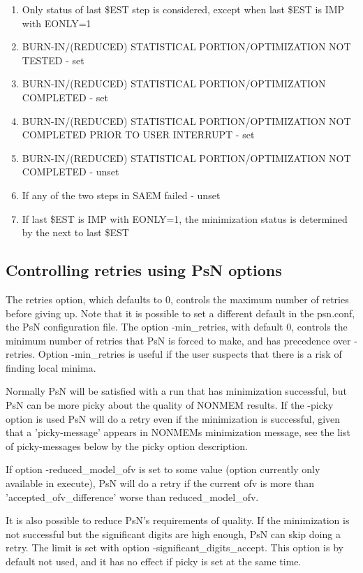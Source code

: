 \begin{enumerate}
\item Only status of last \$EST step is considered, except when last \$EST is IMP with EONLY=1
\item BURN-IN/(REDUCED) STATISTICAL PORTION/OPTIMIZATION NOT TESTED - set
\item BURN-IN/(REDUCED) STATISTICAL PORTION/OPTIMIZATION COMPLETED -  set
\item BURN-IN/(REDUCED) STATISTICAL PORTION/OPTIMIZATION NOT COMPLETED PRIOR TO USER INTERRUPT - set
\item BURN-IN/(REDUCED) STATISTICAL PORTION/OPTIMIZATION NOT COMPLETED - unset
\item If any of the two steps in SAEM failed - unset 
\item If last \$EST is IMP with EONLY=1, the minimization status is determined by the next to last \$EST
\end{enumerate}

\subsection{Controlling retries using PsN options}
The retries option, which defaults to 0, controls the maximum number of retries before giving up. Note that it is 
possible to set a different default in the psn.conf, the PsN configuration file. The option -min\_retries, 
with default 0, controls the minimum number of retries that PsN is forced to make, and has precedence over -retries. 
Option -min\_retries is useful if the user suspects that there is a risk of finding local minima.

Normally PsN will be satisfied with a run that has minimization successful, but PsN can be more picky about the 
quality of NONMEM results. If the -picky option is used PsN will do a retry even if the minimization is successful, 
given that a 'picky-message' appears in NONMEMs minimization message, see the list of picky-messages below by the picky option description.

If option -reduced\_model\_ofv is set to some value (option currently only available in execute),
PsN will do a retry if the current ofv is more than 'accepted\_ofv\_difference' worse than
reduced\_model\_ofv.

It is also possible to reduce PsN's requirements of quality. If the minimization is not successful but the significant 
digits are high enough, PsN can skip doing a retry. The limit is set with option -significant\_digits\_accept. This option 
is by default not used, and it has no effect if picky is set at the same time.

